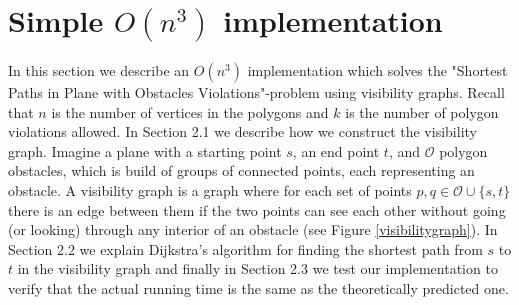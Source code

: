 \chapter{Simple $O(n^3)$ implementation}
In this section we describe an $O(n^3)$ implementation which solves the
"Shortest Paths in Plane with Obstacles Violations"-problem using visibility
graphs. Recall that $n$ is
the number of vertices in the polygons and $k$ is the number of polygon
violations allowed. In Section 2.1 we describe how we construct the
visibility graph. Imagine a plane with a starting point $s$, an end point $t$,
and $\mathcal{O}$ polygon obstacles, which is build of groups of connected points,
each representing an obstacle. A visibility graph is a graph where for each set of
points $p,q\in \mathcal{O} \cup \{s,t\}$  there is an edge between them if the 
two points can see each other
without going (or looking) through any interior of an obstacle (see Figure
\ref{visibilitygraph}). In Section 2.2 we explain Dijkstra's algorithm
for finding the shortest path from $s$ to $t$ in the visibility graph and
finally in Section 2.3 we test our implementation to verify that the actual 
running time is the same as the theoretically predicted one.

